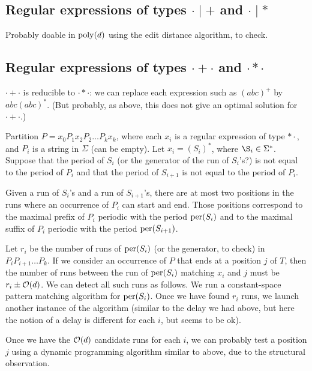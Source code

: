 \documentclass{article}
\begin{document}

\subsection{Regular expressions of types $\cdot \mid +$ and $\cdot \mid *$}
\label{sec:cdot-mid-plus}
Probably doable in $\mathrm{poly}(d)$ using the edit distance algorithm, to check.

\subsection{Regular expressions of types $\cdot + \cdot$ and $\cdot * \cdot$}
\label{sec:cdot-plus-cdot}

$\cdot + \cdot$ is reducible to $\cdot * \cdot$: we can replace each expression such as $(abc)^+$ by $abc (abc)^*$. (But probably, as above, this does not give an optimal solution for $\cdot + \cdot$.)

Partition $P = x_0 P_1 x_2 P_2 \ldots P_k x_k$, where each $x_i$ is a regular expression of type $*\cdot$, and $P_i$ is a string in $\Sigma$ (can be empty). Let $x_i = (S_i)^*$, where $\S_i \in \Sigma^*$. Suppose that the period of $S_i$ (or the generator of the run of $S_i$'s?) is not equal to the period of $P_i$ and that the period of $S_{i+1}$ is not equal to the period of $P_i$. 

\begin{observation}
Given a run of $S_i$'s and a run of $S_{i+1}$'s, there are at most two positions in the runs where an occurrence of $P_i$ can start and end. Those positions correspond to the maximal prefix of $P_i$ periodic with the period $\mathrm{per}(S_i)$ and to the maximal suffix of $P_i$ periodic with the period $\mathrm{per}(S_{i+1})$. 
\end{observation}

Let $r_i$ be the number of runs of $\mathrm{per}(S_i)$ (or the generator, to check) in $P_{i} P_{i+1} \ldots P_k$. If we consider an occurrence of $P$ that ends at a position $j$ of $T$, then the number of runs between the run of $\mathrm{per}(S_i)$ matching $x_i$ and $j$ must be $r_i \pm \mathcal{O}(d)$. We can detect all such runs as follows. We run a constant-space pattern matching algorithm for $\mathrm{per}(S_i)$. Once we have found $r_i$ runs, we launch another instance of the algorithm (similar to the delay we had above, but here the notion of a delay is different for each $i$, but seems to be ok).

Once we have the $\mathcal{O}(d)$ candidate runs for each $i$, we can probably test a position $j$ using a dynamic programming algorithm similar to above, due to the structural observation.
\end{document}
